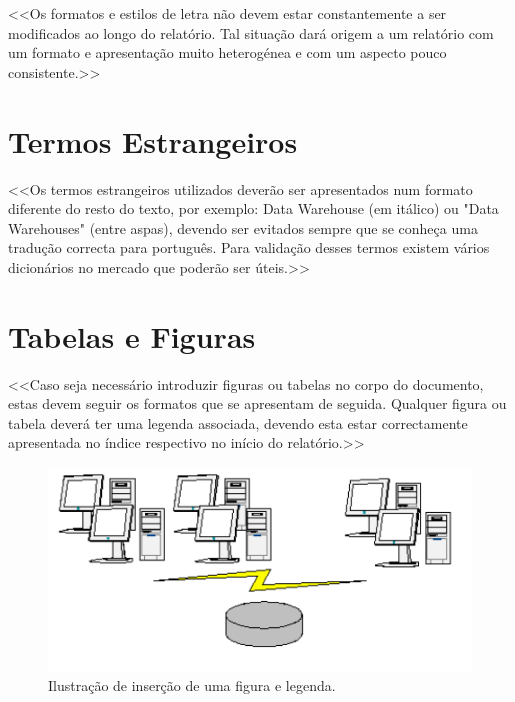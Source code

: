 \documentclass[a4paper,12pt]{scrreprt}
\begin{document}
        <<Os formatos e estilos de letra não devem estar constantemente a ser modificados ao longo do relatório. Tal situação dará origem a um relatório com um formato e apresentação muito heterogénea e com um aspecto pouco consistente.>>
    \section{Termos Estrangeiros}
        <<Os termos estrangeiros utilizados deverão ser apresentados num formato diferente do resto do texto, por exemplo: Data Warehouse (em itálico) ou "Data Warehouses" (entre aspas), devendo ser evitados sempre que se conheça uma tradução correcta para português. Para validação desses termos existem vários dicionários no mercado que poderão ser úteis.>>
    \section{Tabelas e Figuras}
        <<Caso seja necessário introduzir figuras ou tabelas no corpo do documento, estas devem seguir os formatos que se apresentam de seguida. Qualquer figura ou tabela deverá ter uma legenda associada, devendo esta estar correctamente apresentada no índice respectivo no início do relatório.>>
        

         \begin{figure}[!h]
            \centering
            \includegraphics[scale=0.7]{images/example.png}
            \caption{Ilustração de inserção de uma figura e legenda.}
         \end{figure}
        
        \vspace*{0.2cm}
        
\end{document}
